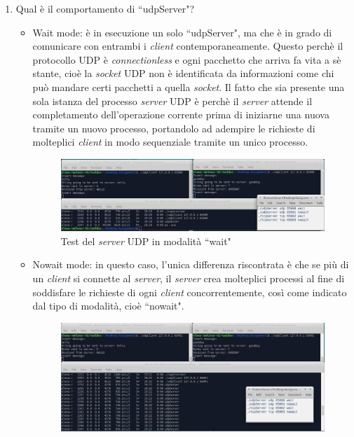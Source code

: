\documentclass[a4paper, 12pt]{report}
\begin{document}
\begin{enumerate}
	\item Qual è il comportamento di ``udpServer"?
	\begin{itemize}
		\item Wait mode: è in esecuzione un solo ``udpServer", ma che è in grado di comunicare con entrambi i \textit{client} contemporaneamente. Questo perchè il protocollo UDP è
		\textit{connectionless} e ogni pacchetto che arriva fa vita a sè stante, cioè la \textit{socket} UDP non è identificata da informazioni come chi può mandare certi
		pacchetti a quella  \textit{socket}. Il fatto che sia presente una sola istanza del processo \textit{server} UDP è perchè il \textit{server} attende il completamento
		dell'operazione corrente prima di iniziarne una nuova tramite un nuovo processo, portandolo ad adempire le richieste di molteplici \textit{client} in modo sequenziale tramite
		un unico processo.
		\begin{figure}[H]
			\centering
			\includegraphics[width=\linewidth]{images/launch_udpClientWait.JPG}
			\caption{Test del \textit{server} UDP in modalità ``wait"}
		\end{figure}
		\item Nowait mode: in questo caso, l'unica differenza riscontrata è che se più di un \textit{client} si connette al \textit{server}, il \textit{server} crea molteplici processi al fine di
		soddisfare le richieste di ogni \textit{client} concorrentemente, così come indicato dal tipo di modalità, cioè ``nowait".
		\begin{figure}[H]
			\centering
			\includegraphics[width=\linewidth]{images/launch_udpClientNowait.JPG}

\end{figure}
\end{itemize}
\end{enumerate}
\end{document}
